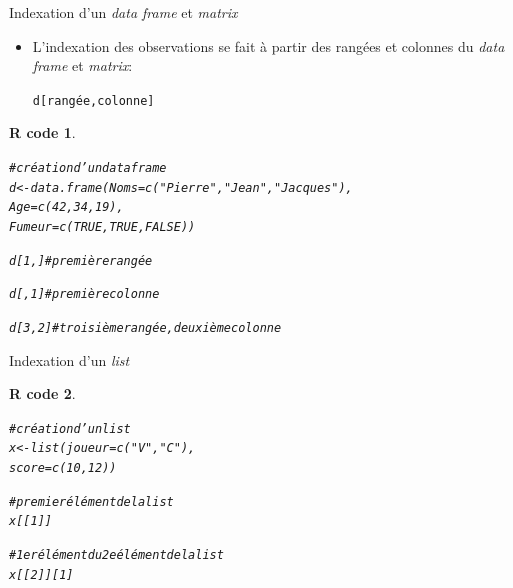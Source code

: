 \documentclass[11pt]{beamer}\usepackage[]{graphicx}\usepackage[]{color}
\makeatletter
\newcommand{\hlnum}[1]{\textcolor[rgb]{0.063,0.58,0.627}{#1}}%
\newcommand{\hlstr}[1]{\textcolor[rgb]{0.063,0.58,0.627}{#1}}%
\newcommand{\hlcom}[1]{\textcolor[rgb]{0.588,0.588,0.588}{#1}}%
\newcommand{\hlstd}[1]{\textcolor[rgb]{0.196,0.196,0.196}{#1}}%
\newcommand{\hlkwb}[1]{\textcolor[rgb]{0.627,0,0.314}{#1}}%
\newcommand{\hlkwc}[1]{\textcolor[rgb]{0,0.631,0.314}{#1}}%
\newcommand{\hlkwd}[1]{\textcolor[rgb]{0.78,0.227,0.412}{#1}}%
\newenvironment{kframe}{%
 \def\at@end@of@kframe{}%
 \ifinner\ifhmode%
  \def\at@end@of@kframe{\end{minipage}}%
  \begin{minipage}{\columnwidth}%
 \fi\fi%
 \def\FrameCommand##1{\hskip\@totalleftmargin \hskip-\fboxsep
 \colorbox{shadecolor}{##1}\hskip-\fboxsep
     \hskip-\linewidth \hskip-\@totalleftmargin \hskip\columnwidth}%
 \MakeFramed {\advance\hsize-\width
   \@totalleftmargin\z@ \linewidth\hsize
   \@setminipage}}%
 {\par\unskip\endMakeFramed%
 \at@end@of@kframe}
\newenvironment{knitrout}{}{} %
\newtheorem{rcode}{R code}[section]
\newcommand{\code}[1]{\texttt{#1}}
\makeatother
\begin{document}
\begin{frame}[fragile]{Indexation d'un \textit{data frame} et \textit{matrix}}

\begin{itemize}
  \setlength\itemsep{2em}
\item L'indexation des observations se fait à partir des rangées et colonnes du \textit{data frame} et \textit{matrix}:
\begin{center}
\code{d[rangée,colonne]}
\end{center}

\end{itemize}

\begin{knitrout}
\color{fgcolor}\begin{kframe}
\begin{rcode}\label{unnamed-chunk-26}\begin{alltt}
\hlcom{# création d'un data frame}
\hlstd{d} \hlkwb{<-} \hlkwd{data.frame}\hlstd{(}\hlkwc{Noms} \hlstd{=} \hlkwd{c}\hlstd{(}\hlstr{"Pierre"}\hlstd{,} \hlstr{"Jean"}\hlstd{,} \hlstr{"Jacques"}\hlstd{),}
\hlkwc{Age} \hlstd{=} \hlkwd{c}\hlstd{(}\hlnum{42}\hlstd{,} \hlnum{34}\hlstd{,} \hlnum{19}\hlstd{),}
\hlkwc{Fumeur} \hlstd{=} \hlkwd{c}\hlstd{(}\hlnum{TRUE}\hlstd{,} \hlnum{TRUE}\hlstd{,} \hlnum{FALSE}\hlstd{))}

\hlstd{d[}\hlnum{1}\hlstd{, ]} \hlcom{# première rangée}

\hlstd{d[ ,}\hlnum{1}\hlstd{]} \hlcom{# première colonne }

\hlstd{d[}\hlnum{3}\hlstd{,}\hlnum{2}\hlstd{]} \hlcom{# troisième rangée, deuxième colonne}
\end{alltt}
\end{rcode}\end{kframe}
\end{knitrout}
\end{frame}




\begin{frame}[fragile]{Indexation d'un \textit{list}}

\begin{knitrout}
\color{fgcolor}\begin{kframe}
\begin{rcode}\label{unnamed-chunk-27}\begin{alltt}
\hlcom{# création d'un list}
\hlstd{x} \hlkwb{<-} \hlkwd{list}\hlstd{(}\hlkwc{joueur} \hlstd{=} \hlkwd{c}\hlstd{(}\hlstr{"V"}\hlstd{,} \hlstr{"C"}\hlstd{),}
                  \hlkwc{score} \hlstd{=} \hlkwd{c}\hlstd{(}\hlnum{10}\hlstd{,} \hlnum{12}\hlstd{))}

\hlcom{# premier élément de la list}
\hlstd{x[[}\hlnum{1}\hlstd{]]}

\hlcom{# 1er élément du 2e élément de la list}
\hlstd{x[[}\hlnum{2}\hlstd{]][}\hlnum{1}\hlstd{]}
\end{alltt}
\end{rcode}\end{kframe}
\end{knitrout}
\end{frame}
\end{document}
